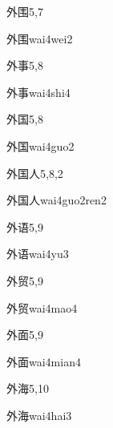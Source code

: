 \begin{entry}{外围}{5,7}
  \begin{phonetics}{外围}{wai4wei2}
  \end{phonetics}
\end{entry}

\begin{entry}{外事}{5,8}
  \begin{phonetics}{外事}{wai4shi4}
  \end{phonetics}
\end{entry}

\begin{entry}{外国}{5,8}
  \begin{phonetics}{外国}{wai4guo2}
  \end{phonetics}
\end{entry}

\begin{entry}{外国人}{5,8,2}
  \begin{phonetics}{外国人}{wai4guo2ren2}
  \end{phonetics}
\end{entry}

\begin{entry}{外语}{5,9}
  \begin{phonetics}{外语}{wai4yu3}
  \end{phonetics}
\end{entry}

\begin{entry}{外贸}{5,9}
  \begin{phonetics}{外贸}{wai4mao4}
  \end{phonetics}
\end{entry}

\begin{entry}{外面}{5,9}
  \begin{phonetics}{外面}{wai4mian4}
  \end{phonetics}
\end{entry}

\begin{entry}{外海}{5,10}
  \begin{phonetics}{外海}{wai4hai3}
  \end{phonetics}
\end{entry}

